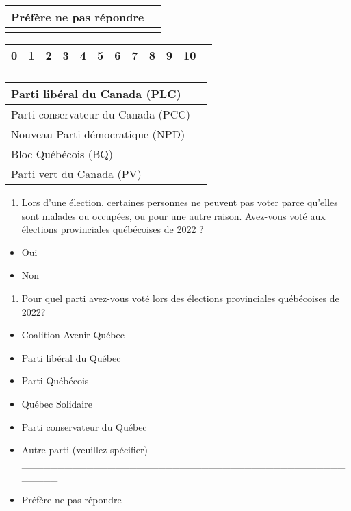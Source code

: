 \documentclass[
  letterpaper,
  DIV=11,
  numbers=noendperiod]{scrreprt}
\providecommand{\tightlist}{%
  \setlength{\itemsep}{0pt}\setlength{\parskip}{0pt}}\usepackage{longtable,booktabs,array}
\begin{document}
\begin{longtable}[]{@{}ll@{}}
\toprule\noalign{}
Préfère ne pas répondre & \\
\midrule\noalign{}
\endhead
\bottomrule\noalign{}
\endlastfoot
\end{longtable}

\begin{longtable}[]{@{}llllllllllll@{}}
\toprule\noalign{}
0 & 1 & 2 & 3 & 4 & 5 & 6 & 7 & 8 & 9 & 10 & \\
\midrule\noalign{}
\endhead
\bottomrule\noalign{}
\endlastfoot
\end{longtable}

\begin{longtable}[]{@{}ll@{}}
\toprule\noalign{}
Parti libéral du Canada (PLC) & \\
\midrule\noalign{}
\endhead
\bottomrule\noalign{}
\endlastfoot
Parti conservateur du Canada (PCC) & \\
Nouveau Parti démocratique (NPD) & \\
Bloc Québécois (BQ) & \\
Parti vert du Canada (PV) & \\
\end{longtable}

\begin{enumerate}
\def\labelenumi{\arabic{enumi}.}
\setcounter{enumi}{18}
\tightlist
\item
  Lors d'une élection, certaines personnes ne peuvent pas voter parce
  qu'elles sont malades ou occupées, ou pour une autre raison. Avez-vous
  voté aux élections provinciales québécoises de 2022 ?
\end{enumerate}

\begin{itemize}
\tightlist
\item
  Oui
\item
  Non
\end{itemize}

\begin{enumerate}
\def\labelenumi{\arabic{enumi}.}
\setcounter{enumi}{19}
\tightlist
\item
  Pour quel parti avez-vous voté lors des élections provinciales
  québécoises de 2022?
\end{enumerate}

\begin{itemize}
\tightlist
\item
  Coalition Avenir Québec
\item
  Parti libéral du Québec
\item
  Parti Québécois
\item
  Québec Solidaire
\item
  Parti conservateur du Québec
\item
  Autre parti (veuillez spécifier)
  \_\_\_\_\_\_\_\_\_\_\_\_\_\_\_\_\_\_\_\_\_\_\_\_\_\_\_\_\_\_\_\_\_\_\_\_\_\_\_\_\_\_\_\_\_\_\_\_\_\_
\item
  Préfère ne pas répondre
\end{itemize}
\end{document}
